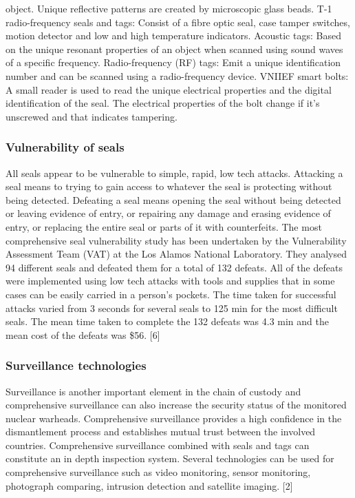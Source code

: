\documentclass[twocolumn,a4paper]{article}
\begin{document}
object. Unique reflective patterns are created by microscopic glass beads.
T-1 radio-frequency seals and tags: Consist of a fibre optic seal, case tamper switches, motion
detector and low and high temperature indicators.
Acoustic tags: Based on the unique resonant properties of an object when scanned using sound
waves of a specific frequency.
Radio-frequency (RF) tags: Emit a unique identification number and can be scanned using a
radio-frequency device.
VNIIEF smart bolts: A small reader is used to read the unique electrical properties and the digital
identification of the seal. The electrical properties of the bolt change if it’s unscrewed and that
indicates tampering.

\subsubsection{Vulnerability of seals}
All seals appear to be vulnerable to simple, rapid, low tech attacks. Attacking a seal means to trying
to gain access to whatever the seal is protecting without being detected. Defeating a seal means
opening the seal without being detected or leaving evidence of entry, or repairing any damage and
erasing evidence of entry, or replacing the entire seal or parts of it with counterfeits. The most
comprehensive seal vulnerability study has been undertaken by the Vulnerability Assessment Team
(VAT) at the Los Alamos National Laboratory. They analysed 94 different seals and defeated them for
a total of 132 defeats. All of the defeats were implemented using low tech attacks with tools and
supplies that in some cases can be easily carried in a person’s pockets. The time taken for successful
attacks varied from 3 seconds for several seals to 125 min for the most difficult seals. The mean time
taken to complete the 132 defeats was 4.3 min and the mean cost of the defeats was \$56. [6]

\subsubsection{Surveillance technologies}
Surveillance is another important element in the chain of custody and comprehensive surveillance
can also increase the security status of the monitored nuclear warheads. Comprehensive
surveillance provides a high confidence in the dismantlement process and establishes mutual trust
between the involved countries. Comprehensive surveillance combined with seals and tags can
constitute an in depth inspection system. Several technologies can be used for comprehensive
surveillance such as video monitoring, sensor monitoring, photograph comparing, intrusion
detection and satellite imaging. [2]
\end{document}
